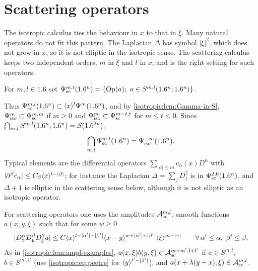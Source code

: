 \section{Scattering operators}\label{isotropic:sec:scattering}

The isotropic calculus ties the behaviour in $x$ to that in $\xi$. Many
natural operators do not fit this pattern. The Laplacian $\Delta$ has
symbol $|\xi|^2$, which does not grow in $x$, so it is not elliptic in the
isotropic sense. The scattering calculus keeps two independent orders, $m$
in $\xi$ and $l$ in $x$, and is the right setting for such operators.

\begin{definition}\label{isotropic:def:Psisc}
For $m,l\in1.6$ set $\Psi^{m,l}_{\mathrm{sc}}(1.6^n)=\{\operatorname{Op}(a);\ a\in S^{m,l}(1.6^n;1.6^n)\}$.
\end{definition}

Thus $\Psi^{m,l}_{\mathrm{sc}}(1.6^n)\subset\langle x\rangle^l\Psi^{m}(1.6^n)$, and by
\cref{isotropic:lem:Gamma-in-S}, $\Psi^{m}_{\mathrm{iso}}\subset\Psi^{m,m}_{\mathrm{sc}}$ if $m\ge0$ and
$\Psi^{m}_{\mathrm{iso}}\subset\Psi^{m-t,t}_{\mathrm{sc}}$ for $m\le t\le0$. Since
$\bigcap_{m,l}S^{m,l}(1.6^n;1.6^n)=\mathcal{S}(1.6^{2n})$,
\begin{equation}\label{isotropic:eq:sc-residual}
  \bigcap_{m,l}\Psi^{m,l}_{\mathrm{sc}}(1.6^n)=\Psi^{-\infty}_{\mathrm{iso}}(1.6^n).
\end{equation}
Typical elements are the differential operators
$\sum_{|\alpha|\le m}c_\alpha(x)D^\alpha$ with
$|\partial^\beta c_\alpha|\le C_\beta\langle x\rangle^{l-|\beta|}$; for instance the
Laplacian $\Delta=\sum_jD_j^2$ is in $\Psi^{2,0}_{\mathrm{sc}}(1.6^n)$, and $\Delta+1$ is
elliptic in the scattering sense below, although it is not elliptic as an
isotropic operator.

For scattering operators one uses the amplitudes $\mathcal{A}^{m,l}_{\mathrm{sc}}$:
smooth functions $a(x,y,\xi)$ such that for some $w\ge0$
\begin{equation*}
  |D_x^\alpha D_y^\beta D_\xi^\gamma a|\le C\langle x\rangle^{l-|\alpha'|-|\beta'|}\langle x-y\rangle^{w+|\alpha'|+|\beta'|}\langle \xi\rangle^{m-|\gamma|}
  \qquad\forall\,\alpha'\le\alpha,\ \beta'\le\beta .
\end{equation*}
As in \cref{isotropic:lem:ampl-examples}, $a(x,\xi)b(y,\xi)\in\mathcal{A}^{m+m',l+l'}_{\mathrm{sc}}$
if $a\in S^{m,l}$, $b\in S^{m',l'}$ (use \eqref{isotropic:eq:peetre} for
$\langle y\rangle^{l'-|\beta'|}$), and $a(x+\lambda(y-x),\xi)\in\mathcal{A}^{m,l}_{\mathrm{sc}}$.

